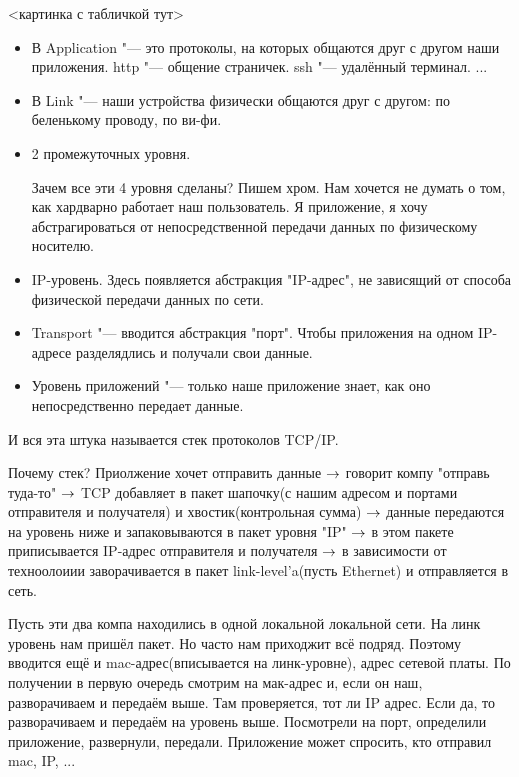 <картинка с табличкой тут>

\begin{itemize}
\item
В Application "--- это протоколы, на которых общаются друг с другом наши приложения.
http "--- общение страничек.
ssh "--- удалённый терминал.
...

\item
В Link "---  наши устройства физически общаются друг с другом: по беленькому проводу, по ви-фи.

\item
2 промежуточных уровня.

Зачем все эти 4 уровня сделаны?
Пишем хром. 
Нам хочется не думать о том, как хардварно работает наш пользователь. 
Я приложение, я хочу абстрагироваться от непосредственной передачи данных по физическому носителю.

\item
IP-уровень. Здесь появляется абстракция "IP-адрес", не зависящий от способа физической передачи данных по сети.

\item
Transport "--- вводится абстракция "порт". 
Чтобы приложения на одном IP-адресе разделядлись и получали свои данные.

\item
Уровень приложений "--- только наше приложение знает, как оно непосредственно передает данные.

\end{itemize}

И вся эта штука называется стек протоколов TCP/IP.

Почему стек?
Приолжение хочет отправить данные $\rightarrow$ 
говорит компу "отправь туда-то" $\rightarrow$ 
TCP добавляет в пакет шапочку(с нашим адресом и портами отправителя и получателя) и хвостик(контрольная сумма) $\rightarrow$ 
данные передаются на уровень ниже и запаковываются в пакет уровня "IP" $\rightarrow$ 
в этом пакете приписывается IP-адрес отправителя и получателя $\rightarrow$ 
в зависимости от техноолоиии заворачивается в пакет link-level'a(пусть Ethernet) и отправляется в сеть.

Пусть эти два компа находились в одной локальной локальной сети.
На линк уровень нам пришёл пакет.
Но часто нам приходжит всё подряд. 
Поэтому вводится ещё и mac-адрес(вписывается на линк-уровне), адрес сетевой платы.
По получении в первую очередь смотрим на мак-адрес и, если он наш, разворачиваем и передаём выше.
Там проверяется, тот ли IP адрес. 
Если да, то разворачиваем и передаём на уровень выше. 
Посмотрели на порт, определили приложение, развернули, передали. 
Приложение может спросить, кто отправил mac, IP, ...

